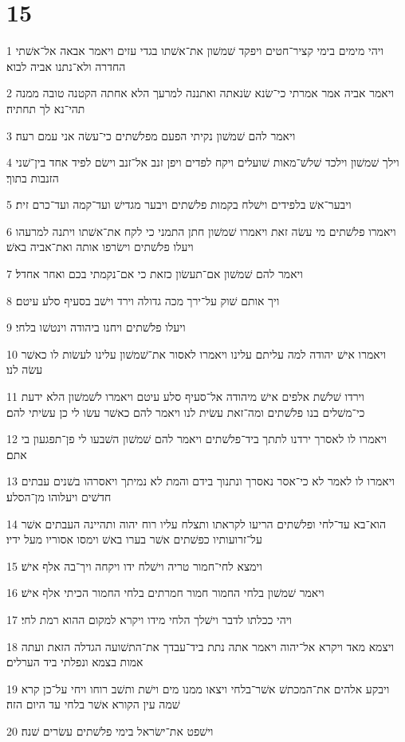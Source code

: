 \chapter{15}

\par 1 ויהי מימים בימי קציר־חטים ויפקד שׁמשׁון את־אשׁתו בגדי עזים ויאמר אבאה אל־אשׁתי החדרה ולא־נתנו אביה לבוא׃
\par 2 ויאמר אביה אמר אמרתי כי־שׂנא שׂנאתה ואתננה למרעך הלא אחתה הקטנה טובה ממנה תהי־נא לך תחתיה׃
\par 3 ויאמר להם שׁמשׁון נקיתי הפעם מפלשׁתים כי־עשׂה אני עמם רעה׃
\par 4 וילך שׁמשׁון וילכד שׁלשׁ־מאות שׁועלים ויקח לפדים ויפן זנב אל־זנב וישׂם לפיד אחד בין־שׁני הזנבות בתוך׃
\par 5 ויבער־אשׁ בלפידים וישׁלח בקמות פלשׁתים ויבער מגדישׁ ועד־קמה ועד־כרם זית׃
\par 6 ויאמרו פלשׁתים מי עשׂה זאת ויאמרו שׁמשׁון חתן התמני כי לקח את־אשׁתו ויתנה למרעהו ויעלו פלשׁתים וישׂרפו אותה ואת־אביה באשׁ׃
\par 7 ויאמר להם שׁמשׁון אם־תעשׂון כזאת כי אם־נקמתי בכם ואחר אחדל׃
\par 8 ויך אותם שׁוק על־ירך מכה גדולה וירד וישׁב בסעיף סלע עיטם׃
\par 9 ויעלו פלשׁתים ויחנו ביהודה וינטשׁו בלחי׃
\par 10 ויאמרו אישׁ יהודה למה עליתם עלינו ויאמרו לאסור את־שׁמשׁון עלינו לעשׂות לו כאשׁר עשׂה לנו׃
\par 11 וירדו שׁלשׁת אלפים אישׁ מיהודה אל־סעיף סלע עיטם ויאמרו לשׁמשׁון הלא ידעת כי־משׁלים בנו פלשׁתים ומה־זאת עשׂית לנו ויאמר להם כאשׁר עשׂו לי כן עשׂיתי להם׃
\par 12 ויאמרו לו לאסרך ירדנו לתתך ביד־פלשׁתים ויאמר להם שׁמשׁון השׁבעו לי פן־תפגעון בי אתם׃
\par 13 ויאמרו לו לאמר לא כי־אסר נאסרך ונתנוך בידם והמת לא נמיתך ויאסרהו בשׁנים עבתים חדשׁים ויעלוהו מן־הסלע׃
\par 14 הוא־בא עד־לחי ופלשׁתים הריעו לקראתו ותצלח עליו רוח יהוה ותהיינה העבתים אשׁר על־זרועותיו כפשׁתים אשׁר בערו באשׁ וימסו אסוריו מעל ידיו׃
\par 15 וימצא לחי־חמור טריה וישׁלח ידו ויקחה ויך־בה אלף אישׁ׃
\par 16 ויאמר שׁמשׁון בלחי החמור חמור חמרתים בלחי החמור הכיתי אלף אישׁ׃
\par 17 ויהי ככלתו לדבר וישׁלך הלחי מידו ויקרא למקום ההוא רמת לחי׃
\par 18 ויצמא מאד ויקרא אל־יהוה ויאמר אתה נתת ביד־עבדך את־התשׁועה הגדלה הזאת ועתה אמות בצמא ונפלתי ביד הערלים׃
\par 19 ויבקע אלהים את־המכתשׁ אשׁר־בלחי ויצאו ממנו מים וישׁת ותשׁב רוחו ויחי על־כן קרא שׁמה עין הקורא אשׁר בלחי עד היום הזה׃
\par 20 וישׁפט את־ישׂראל בימי פלשׁתים עשׂרים שׁנה׃

